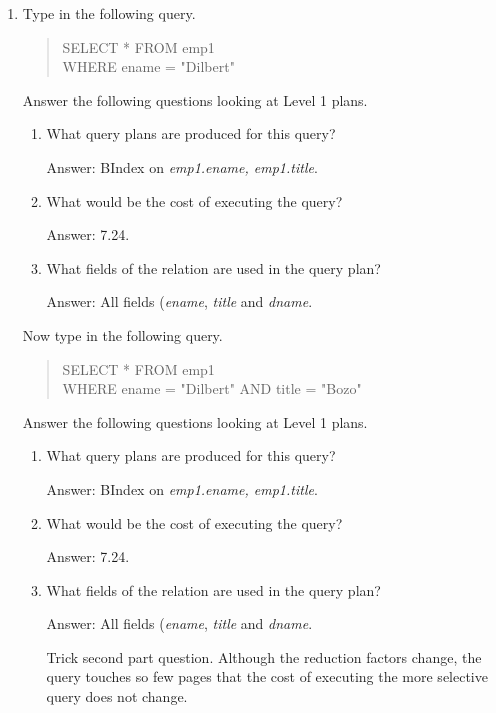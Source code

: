 \begin{enumerate}
\item
Type in the following query.  
\begin{quote}
        SELECT * FROM emp1\\
        WHERE ename = "Dilbert"
\end{quote}

Answer the following questions looking at Level 1 plans.
\begin{enumerate}
\item
What query plans are produced for this query?

Answer: BIndex on {\em emp1.ename, emp1.title}.

\item
What would be the cost of executing the query?

Answer: 7.24.

\item
What fields of the relation are used in the query plan?

Answer: All fields ({\em ename}, {\em title} and {\em dname}.

\end{enumerate}

Now type in the following query.
\begin{quote}
        SELECT * FROM emp1\\
        WHERE ename = "Dilbert" AND title = "Bozo"
\end{quote}

Answer the following questions looking at Level 1 plans.
\begin{enumerate}
\item
What query plans are produced for this query?

Answer: BIndex on {\em emp1.ename, emp1.title}.

\item
What would be the cost of executing the query?

Answer: 7.24.

\item
What fields of the relation are used in the query plan?

Answer: All fields ({\em ename}, {\em title} and {\em dname}.

Trick second part question.  Although the reduction factors change, the
query touches so few pages that the cost of executing the more selective
query does not change.
\end{enumerate}



\end{enumerate}
